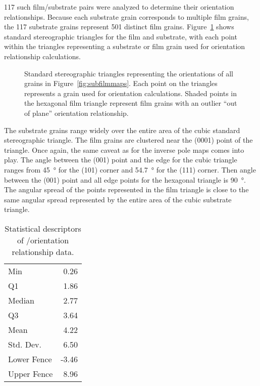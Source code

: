 \documentclass[12pt,%
              twoside,
               letterpaper]{uiothesis}
\begin{document}
117 such film/substrate pairs were analyzed to determine their orientation relationships.
Because each substrate grain corresponds to multiple film grains, the 117 substrate grains
represent 501 distinct film grains. Figure~\ref{fig:subfilmipfs} shows standard stereographic
triangles for the film and substrate, with each point within the triangles representing a
substrate or film grain used for orientation relationship calculations.
\begin{figure}
		\caption[Orientation of film and substrate grains]{%
			Standard stereographic triangles representing the orientations
			of all grains in Figure~\ref{fig:subfilmmaps}. Each point on the 
			triangles represents a grain used for orientation calculations.
			Shaded points in the hexagonal film triangle represent film grains
			with an outlier ``out of plane'' orientation relationship.}
	\label{fig:subfilmipfs}
\end{figure}
The substrate grains range widely over the entire area of the cubic standard stereographic
triangle. The film grains are clustered near the (0001) point of the triangle. Once again,
the same caveat as for the inverse pole maps comes into play. The angle between the (001)
point and the edge for the cubic triangle ranges from \SI{45}{\degree} for the (101)
corner and \SI{54.7}{\degree} for the (111) corner. Then angle between the (001) point and
all edge points for the hexagonal triangle is \SI{90}{\degree}. The angular spread of the
points represented in the film triangle is close to the same angular spread represented by
the entire area of the cubic substrate triangle.
\begin{table}
	
	\begin{center}
\begin{tabular}{lr}
	
		Min &
		0.26 \\
		
		Q1 &
		1.86 \\
		
		Median &
		2.77 \\
		
		Q3 &
		3.64 \\
		
		Mean &
		4.22 \\
		
		Std. Dev. &
		6.50 \\
		
		Lower Fence &
		-3.46 \\
		
		Upper Fence &
		8.96 \\
		
	\end{tabular}

\end{center}	\caption[Statistical descriptors of orientation relationship
data]{Statistical descriptors of \feo[0001]/\sto[111] orientation relationship data.}
	\label{tab:outofplanestats}


\end{table}
\end{document}

